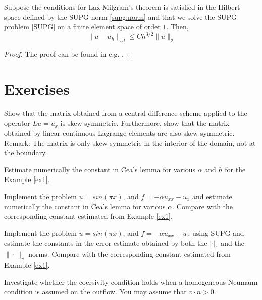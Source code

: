\begin{theorem}
Suppose the conditions for Lax-Milgram's theorem is satisfied 
in the Hilbert space defined by the SUPG norm \eqref{supg:norm}
and that
we solve the SUPG problem \eqref{SUPG} on a finite element space
of order $1$. Then,  
\[\|u-u_h\|_{sd} \le Ch^{3/2}\|u\|_{2}\]
\end{theorem}

\begin{proof}
The proof can be found in e.g. \cite{elman2014finite, quarteroni2008numerical}. 
\end{proof}

\section{Exercises}

\begin{exercise}
Show that the matrix obtained from a central difference scheme applied to 
the operator $L u = u_x$ is skew-symmetric. Furthermore, show that
the matrix obtained by linear continuous Lagrange elements are also 
skew-symmetric. Remark: The matrix is only skew-symmetric in the  interior
of the domain, not at the boundary.    
\end{exercise}

\begin{exercise}
Estimate numerically the constant in Cea's lemma for various $\alpha$ and $h$ for the  Example \ref{ex1}. 
\end{exercise}

\begin{exercise}
Implement the problem $u=sin(\pi x)$, and $f = -\alpha u_{xx} - u_x$ and 
estimate numerically the constant in Cea's lemma for various $\alpha $.       
Compare with the corresponding constant estimated from Example \ref{ex1}. 
\end{exercise}


\begin{exercise}
Implement the problem $u=sin(\pi x)$, and $f = -\alpha u_{xx} - u_x$ using
SUPG and estimate the constants in the error estimate obtained by 
both the $|\cdot|_1$ and  the $\| \cdot \|_{v}$      
norms. 
Compare with the corresponding constant estimated from Example \ref{ex1}. 
\end{exercise}

 
 
\begin{exercise}
Investigate whether the coersivity condition holds when a 
homogeneous Neumann condition is assumed on the outflow. 
You may assume that $v\cdot n > 0$.   
\end{exercise}

